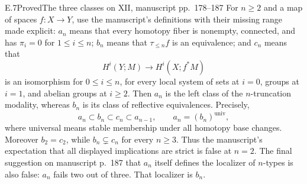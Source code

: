 \begin{claim}{E.7}{Proved}{The three classes on XII, manuscript pp.~178--187}
For $n\geq2$ and a map of spaces $f:X\to Y$, use the manuscript's
definitions with their missing range made explicit:
$a_n$ means that every homotopy fiber is nonempty, connected,
and has $\pi_i=0$ for $1\leq i\leq n$;
$b_n$ means that $\tau_{\leq n}f$ is an equivalence;
and $c_n$ means that
\[
 H^i(Y;M)\longrightarrow H^i(X;f^*M)
\]
is an isomorphism for $0\leq i\leq n$, for every local system
of sets at $i=0$, groups at $i=1$, and abelian groups at
$i\geq2$. Then $a_n$ is the left class of the
$n$-truncation modality, whereas $b_n$ is its class of
reflective equivalences. Precisely,
\[
 a_n\subset b_n\subset c_n\subset a_{n-1},
 \qquad a_n=(b_n)^{\mathrm{univ}},
\]
where universal means stable membership under all homotopy
base changes. Moreover $b_2=c_2$, while $b_n\subsetneq c_n$
for every $n\geq3$. Thus the manuscript's expectation that
all displayed implications are strict is false at $n=2$.
The final suggestion on manuscript p.~187 that $a_n$ itself
defines the localizer of $n$-types is also false: $a_n$ fails
two out of three. That localizer is $b_n$.
\end{claim}
